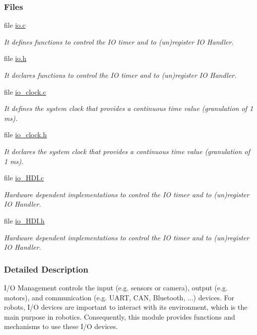 \subsubsection*{Files}
\begin{DoxyCompactItemize}
\item 
file \hyperlink{io_8c}{io.\+c}
\begin{DoxyCompactList}\small\item\em It defines functions to control the I\+O timer and to (un)register I\+O Handler. \end{DoxyCompactList}\item 
file \hyperlink{io_8h}{io.\+h}
\begin{DoxyCompactList}\small\item\em It declares functions to control the I\+O timer and to (un)register I\+O Handler. \end{DoxyCompactList}\item 
file \hyperlink{io__clock_8c}{io\+\_\+clock.\+c}
\begin{DoxyCompactList}\small\item\em It defines the system clock that provides a continuous time value (granulation of 1 ms). \end{DoxyCompactList}\item 
file \hyperlink{io__clock_8h}{io\+\_\+clock.\+h}
\begin{DoxyCompactList}\small\item\em It declares the system clock that provides a continuous time value (granulation of 1 ms). \end{DoxyCompactList}\item 
file \hyperlink{io__HDI_8c}{io\+\_\+\+H\+D\+I.\+c}
\begin{DoxyCompactList}\small\item\em Hardware dependent implementations to control the I\+O timer and to (un)register I\+O Handler. \end{DoxyCompactList}\item 
file \hyperlink{io__HDI_8h}{io\+\_\+\+H\+D\+I.\+h}
\begin{DoxyCompactList}\small\item\em Hardware dependent implementations to control the I\+O timer and to (un)register I\+O Handler. \end{DoxyCompactList}\end{DoxyCompactItemize}


\subsubsection{Detailed Description}
I/\+O Management controls the input (e.\+g. sensors or camera), output (e.\+g. motors), and communication (e.\+g. U\+A\+R\+T, C\+A\+N, Bluetooth, ...) devices. For robots, I/\+O devices are important to interact with its environment, which is the main purpose in robotics. Consequently, this module provides functions and mechanisms to use these I/\+O devices. 

